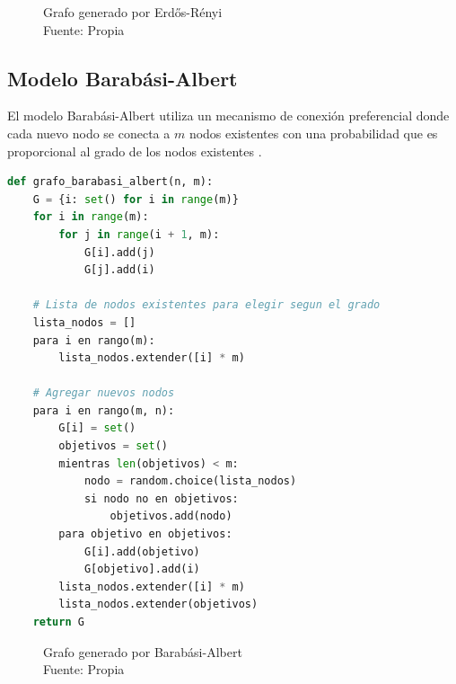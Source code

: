 \begin{figure}
\caption{Grafo generado por Erdős-Rényi\\Fuente: Propia}
\end{figure}

\subsection{Modelo Barabási-Albert}

El modelo Barabási-Albert utiliza un mecanismo de conexión preferencial donde cada nuevo nodo se conecta a \( m \) nodos existentes con una probabilidad que es proporcional al grado de los nodos existentes \citep{Barabasi1999} .

\begin{lstlisting}[language=Python]
def grafo_barabasi_albert(n, m):
    G = {i: set() for i in range(m)}
    for i in range(m):
        for j in range(i + 1, m):
            G[i].add(j)
            G[j].add(i)

    # Lista de nodos existentes para elegir segun el grado
    lista_nodos = []
    para i en rango(m):
        lista_nodos.extender([i] * m)

    # Agregar nuevos nodos
    para i en rango(m, n):
        G[i] = set()
        objetivos = set()
        mientras len(objetivos) < m:
            nodo = random.choice(lista_nodos)
            si nodo no en objetivos:
                objetivos.add(nodo)
        para objetivo en objetivos:
            G[i].add(objetivo)
            G[objetivo].add(i)
        lista_nodos.extender([i] * m)
        lista_nodos.extender(objetivos)
    return G
\end{lstlisting}

\begin{figure}[h]
\caption{Grafo generado por Barabási-Albert\\Fuente: Propia}
\end{figure}
\newpage

